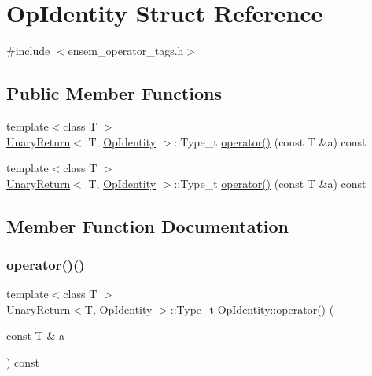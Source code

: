 \hypertarget{structOpIdentity}{}\section{Op\+Identity Struct Reference}
\label{structOpIdentity}


{\ttfamily \#include $<$ensem\+\_\+operator\+\_\+tags.\+h$>$}

\subsection*{Public Member Functions}
\begin{DoxyCompactItemize}
\item 
{\footnotesize template$<$class T $>$ }\\\mbox{\hyperlink{structUnaryReturn}{Unary\+Return}}$<$ T, \mbox{\hyperlink{structOpIdentity}{Op\+Identity}} $>$\+::Type\+\_\+t \mbox{\hyperlink{structOpIdentity_a1d482adc4d4bd1a7fee1616bb11c1f71}{operator()}} (const T \&a) const
\item 
{\footnotesize template$<$class T $>$ }\\\mbox{\hyperlink{structUnaryReturn}{Unary\+Return}}$<$ T, \mbox{\hyperlink{structOpIdentity}{Op\+Identity}} $>$\+::Type\+\_\+t \mbox{\hyperlink{structOpIdentity_a1d482adc4d4bd1a7fee1616bb11c1f71}{operator()}} (const T \&a) const
\end{DoxyCompactItemize}


\subsection{Member Function Documentation}
\mbox{\label{structOpIdentity_a1d482adc4d4bd1a7fee1616bb11c1f71}} 
\subsubsection{\texorpdfstring{operator()()}{operator()()}\hspace{0.1cm}{\footnotesize\ttfamily [1/2]}}
{\footnotesize\ttfamily template$<$class T $>$ \\
\mbox{\hyperlink{structUnaryReturn}{Unary\+Return}}$<$T, \mbox{\hyperlink{structOpIdentity}{Op\+Identity}} $>$\+::Type\+\_\+t Op\+Identity\+::operator() (\begin{DoxyParamCaption}\item[{const T \&}]{a }\end{DoxyParamCaption}) const\hspace{0.3cm}{\ttfamily [inline]}}

